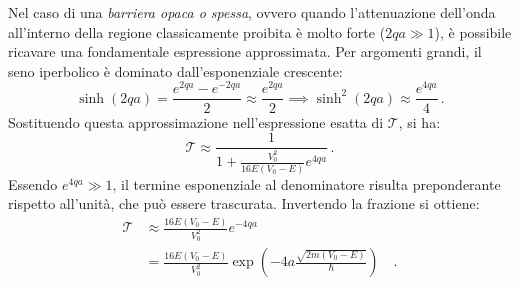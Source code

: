 \begin{approfondimento}[title={Approssimazione di barriera spessa}]
    \noindent
Nel caso di una \emph{barriera opaca o spessa}, ovvero quando l'attenuazione dell'onda all'interno della regione classicamente proibita è molto forte ($2qa \gg 1$), è possibile ricavare una fondamentale espressione approssimata. Per argomenti grandi, il seno iperbolico è dominato dall'esponenziale crescente:
\[
    \sinh(2qa) = \frac{e^{2qa} - e^{-2qa}}{2} \approx \frac{e^{2qa}}{2} \implies \sinh^2(2qa) \approx \frac{e^{4qa}}{4} \,.
\]
Sostituendo questa approssimazione nell'espressione esatta di $\mathcal{T}$, si ha:
\[
    \mathcal{T} \approx \frac{1}{1 + \frac{V_0^2}{16E(V_0 - E)} e^{4qa}} \,.
\]
Essendo $e^{4qa} \gg 1$, il termine esponenziale al denominatore risulta preponderante rispetto all'unità, che può essere trascurata. Invertendo la frazione si ottiene:
\[
\begin{aligned}
    \mathcal{T} &\approx \frac{16E(V_0 - E)}{V_0^2} e^{-4qa} \\
                &= \frac{16E(V_0 - E)}{V_0^2} \exp\left(-4a\frac{\sqrt{2m(V_0 - E)}}{\hbar}\right) \quad .
\end{aligned}
\]
\end{approfondimento}